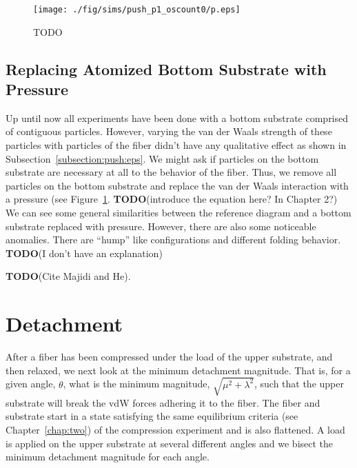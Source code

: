 	\begin{figure}
		\begin{center}
			\texttt{[image: ./fig/sims/push\_p1\_oscount0/p.eps]}
		\end{center}		
		\caption{ TODO
		\label{fig:PushGrid:p1}}
	\end{figure}

\subsection{Replacing Atomized Bottom Substrate with Pressure}

Up until now all experiments have been done with a bottom substrate comprised of contiguous particles. However, varying the van der Waals strength of these particles with particles of the fiber didn't have any qualitative effect as shown in Subsection~\ref{subsection:push:eps}. We might ask if particles on the bottom substrate are necessary at all to the behavior of the fiber. Thus, we remove all particles on the bottom substrate and replace the van der Waals interaction with a pressure (see Figure~\ref{fig:PushGrid:p1}. \textbf{TODO}(introduce the equation here? In Chapter 2?) We can see some general similarities between the reference diagram and a bottom substrate replaced with pressure. However, there are also some noticeable anomalies. There are ``hump'' like configurations and different folding behavior. \textbf{TODO}(I don't have an explanation)

\textbf{TODO}(Cite Majidi and He).

\section{Detachment}

After a fiber has been compressed under the load of the upper substrate, and then relaxed, we next look at the minimum detachment magnitude. That is, for a given angle, $\theta$, what is the minimum magnitude, $\sqrt{\mu^2 + \lambda^2}$, such that the upper substrate will break the vdW forces adhering it to the fiber. The fiber and substrate start in a state satisfying the same equilibrium criteria (see Chapter~\ref{chap:two}) of the compression experiment and is also flattened. A load is applied on the upper substrate at several different angles and we bisect the minimum detachment magnitude for each angle.

